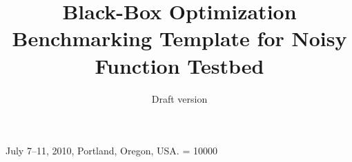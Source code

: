 \documentclass{sig-alternate}
\begin{document}
%
 {July 7--11, 2010, Portland, Oregon, USA.}
\widowpenalty = 10000

\title{Black-Box Optimization Benchmarking Template for Noisy Function
Testbed
}
\subtitle{Draft version
}

%
%
%
%
%
\end{document}
